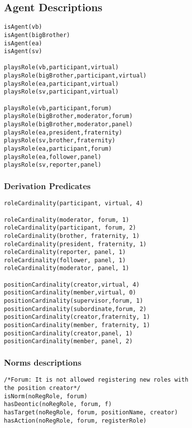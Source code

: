 \subsection*{Agent Descriptions }
\begin{verbatim}
isAgent(vb)
isAgent(bigBrother)
isAgent(ea)
isAgent(sv)

playsRole(vb,participant,virtual)
playsRole(bigBrother,participant,virtual)
playsRole(ea,participant,virtual)
playsRole(sv,participant,virtual)

playsRole(vb,participant,forum)
playsRole(bigBrother,moderator,forum)
playsRole(bigBrother,moderator,panel)
playsRole(ea,president,fraternity)
playsRole(sv,brother,fraternity)
playsRole(ea,participant,forum)
playsRole(ea,follower,panel)
playsRole(sv,reporter,panel)

\end{verbatim}


\subsubsection*{Derivation Predicates}
\begin{verbatim}
roleCardinality(participant, virtual, 4)

roleCardinality(moderator, forum, 1)
roleCardinality(participant, forum, 2)
roleCardinality(brother, fraternity, 1)
roleCardinality(president, fraternity, 1)
roleCardinality(reporter, panel, 1)
roleCardinality(follower, panel, 1)
roleCardinality(moderator, panel, 1)

positionCardinality(creator,virtual, 4)
positionCardinality(member,virtual, 0)
positionCardinality(supervisor,forum, 1)
positionCardinality(subordinate,forum, 2)
positionCardinality(creator,fraternity, 1)
positionCardinality(member, fraternity, 1)
positionCardinality(creator,panel, 1)
positionCardinality(member, panel, 2)

\end{verbatim}

\subsubsection*{Norms descriptions}


\begin{verbatim}
/*Forum: It is not allowed registering new roles with
the position creator*/
isNorm(noRegRole, forum)
hasDeontic(noRegRole, forum, f)
hasTarget(noRegRole, forum, positionName, creator)
hasAction(noRegRole, forum, registerRole)
\end{verbatim}

